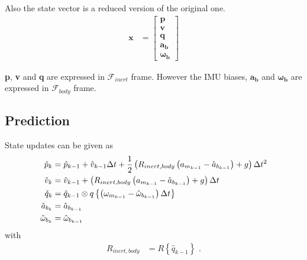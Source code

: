 \documentclass{article}
\begin{document}
Also the state vector is a reduced version of the original one.
\begin{align}
    \textbf{x} &= \left[\begin{matrix}{}\textbf{p}\\\textbf{v}\\\textbf{q}\\\boldsymbol{a_b}\\\boldsymbol{\omega_b}\end{matrix}\right]
\end{align}{}

\textbf{p}, \textbf{v} and \textbf{q} are expressed in $\mathcal{F}_{inert}$ frame. However the IMU biases, $\boldsymbol{a_b}$ and $\boldsymbol{\omega_b}$ are expressed in $\mathcal{F}_{body}$ frame.

\subsection{Prediction}
State updates can be given as
\begin{align}
    \Check{p}_k &= \hat{p}_{k-1}+\hat{v}_{k-1}\Delta t + \frac{1}{2} \left( R_{inert,body}\left(a_{m_{k-1}}-\hat{a}_{b_{k-1}}\right)+g\right)\Delta t^2 \\
    \Check{v}_k &= \hat{v}_{k-1}+\left(R_{inert,body}\left(a_{m_{k-1}}-\hat{a}_{b_{k-1}}\right)+g\right)\Delta t \\
    \Check{q}_k &= \hat{q}_{k-1}\otimes q\left\{\left(\omega_{m_{k-1}}-\hat{\omega}_{b_{k-1}}\right)\Delta t\right\} \\
    \Check{a}_{b_k} &= \hat{a}_{b_{k-1}} \\
    \Check{\omega}_{b_{k}} &= \hat{\omega}_{b_{k-1}}
\end{align}{}
with
\begin{align}
    R_{inert,body} &= R\left\{\hat{q}_{k-1}\right\} \text{ .}
\end{align}{}
\end{document}
